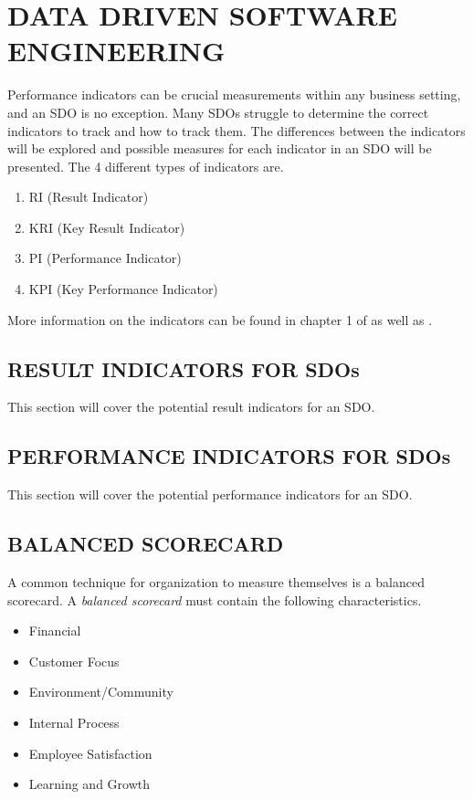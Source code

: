 \documentclass[SDSUThesis.tex]{subfiles}
\begin{document}
\section{DATA DRIVEN SOFTWARE ENGINEERING}

Performance indicators can be crucial measurements
within any business setting, and an SDO is no exception. Many
SDOs struggle to determine the correct indicators to track and
how to track them.  
The differences between the indicators will be explored and
possible measures for each indicator in an SDO will be
presented.  The 4 different types of indicators are.
\begin{enumerate}
  \item RI (Result Indicator)
  \item KRI (Key Result Indicator)
  \item PI (Performance Indicator)
  \item KPI (Key Performance Indicator)
\end{enumerate}

More information on the indicators can be found
in chapter 1 of \cite{parmenter2010}
as well as \cite{florac1999,kaplan1992,letier2013}.

\subsection{RESULT INDICATORS FOR SDOs}
    This section will cover the potential result indicators for an SDO.

\subsection{PERFORMANCE INDICATORS FOR SDOs}
    This section will cover the potential performance indicators for an SDO.

\subsection{BALANCED SCORECARD}

A common technique for organization to measure themselves is a balanced scorecard.
A \textit{balanced scorecard} must contain the following
characteristics.
\begin{itemize}
  \item Financial 
  \item Customer Focus
  \item Environment/Community
  \item Internal Process
  \item Employee Satisfaction
  \item Learning and Growth
\end{itemize}
\end{document}
